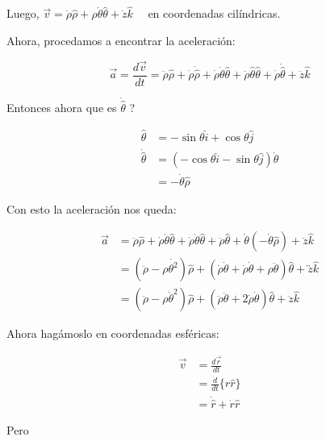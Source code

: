 Luego, $\vec{v}=\dot{\rho} \widehat{\rho}+\rho \dot{\theta} \hat{\theta}+\dot{z} \hat{k} \quad$ en coordenadas cilíndricas.

Ahora, procedamos a encontrar la aceleración:

$$
\vec{a}=\frac{d \vec{v}}{d t}=\ddot{\rho} \widehat{\rho}+\dot{\rho} \dot{\hat{\rho}}+\dot{\rho} \dot{\theta} \widehat{\theta}+\ddot{\rho} \hat{\theta} \hat{\theta}+\dot{\rho} \dot{\hat{\theta}}+\ddot{z} \hat{k}
$$

Entonces ahora que es $\dot{\hat{\theta}}$ ?

$$
\begin{aligned}
\widehat{\theta} & =-\sin \theta \hat{i}+\cos \theta \hat{j} \\
\dot{\hat{\theta}} & =(-\cos \theta \hat{i}-\sin \theta \hat{j}) \dot{\theta} \\
& =-\dot{\theta} \hat{\rho}
\end{aligned}
$$

Con esto la aceleración nos queda:

$$
\begin{aligned}
\vec{a} & =\ddot{\rho} \hat{\rho}+\dot{\rho} \dot{\theta} \hat{\theta}+\dot{\rho} \dot{\theta} \hat{\theta}+\ddot{\rho} \hat{\theta}+\dot{\theta}(-\dot{\theta} \widehat{\rho})+\ddot{z} \hat{k} \\
& =\left(\ddot{\rho}-\rho \dot{\theta^{2}}\right) \widehat{\rho}+(\dot{\rho} \dot{\theta}+\dot{\rho} \dot{\theta}+\rho \ddot{\theta}) \widehat{\theta}+\overleftrightarrow{z} \hat{k} \\
& =\left(\ddot{\rho}-\rho \dot{\theta}^{2}\right) \widehat{\rho}+(\ddot{\rho} \ddot{\theta}+2 \dot{\rho} \dot{\theta}) \hat{\theta}+\ddot{z} \hat{k}
\end{aligned}
$$

Ahora hagámoslo en coordenadas esféricas:

$$
\begin{aligned}
\vec{v} & =\frac{d \vec{r}}{d t} \\
& =\frac{d}{d t}\{r \widehat{r}\} \\
& =\dot{\hat{r}}+\dot{r} \widehat{r}
\end{aligned}
$$

Pero

